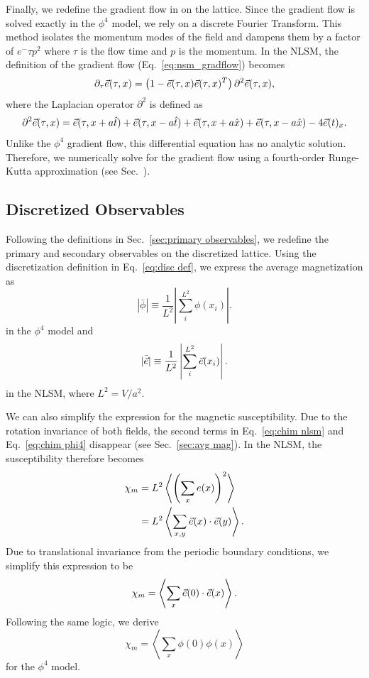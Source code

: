 Finally, we redefine the gradient flow in on the lattice. Since the gradient flow is solved exactly in the $\phi^4$ model, we rely on a discrete Fourier Transform. This method isolates the momentum modes of the field and dampens them by a factor of $e^-{\tau p^2}$ where $\tau$ is the flow time and $p$ is the momentum. In the NLSM, the definition of the gradient flow (Eq.~\ref{eq:nsm_gradflow}) becomes 
\begin{equation}
    \label{eq:nsm_gradflow_disc}
    \partial_\tau \vec e (\tau, x) = \left( 1 - \vec e(\tau,x) \vec e(\tau,x)^T\right) \partial^2 \vec e(\tau,x),
\end{equation}
 where the Laplacian operator $\partial^2$ is defined as
\begin{equation*}
    \partial^2 \vec e(\tau,x) = \vec e(\tau, x+a \hat{t}) + \vec e(\tau,x-a\hat t) + \vec e(\tau, x+a \hat{x}) + \vec e(\tau,x-a\hat x) - 4 \vec e(t)_x.
\end{equation*}
Unlike the $\phi^4$ gradient flow, this differential equation has no analytic solution. Therefore, we numerically solve for the gradient flow using a fourth-order Runge-Kutta approximation (see Sec.~\label{sec:runga-kutta}).

\subsection{Discretized Observables}
Following the definitions in Sec.~\ref{sec:primary observables}, we redefine the primary and secondary observables on the discretized lattice. Using the discretization definition in Eq.~\ref{eq:disc def}, we express the average magnetization as 
\begin{equation}
|\bar\phi| \equiv \frac{1}{L^2}\left| \sum_i^{L^2} \phi(x_i)\right|.
\end{equation}
in the $\phi^4$ model and 
\begin{equation}
    |\bar{\vec e}| \equiv \frac{1}{L^2}\left|\sum_i^{L^2} \vec e(x_i)\right|.
\end{equation}
in the NLSM, where $L^2 = V/a^2$.

We can also simplify the expression for the magnetic susceptibility. Due to the rotation invariance of both fields, the second terms in Eq.~\ref{eq:chim nlsm} and Eq.~\ref{eq:chim phi4} disappear (see Sec.~\ref{sec:avg mag}). In the NLSM, the susceptibility therefore becomes
\begin{align}
    \chi_m &= L^2 \left\langle \left( \sum_x e(x) \right)^2\right\rangle  \\
           &= L^2 \left\langle \sum_{x,y}\vec e(x)\cdot \vec e(y) \right\rangle. 
\end{align}
Due to translational invariance from the periodic boundary conditions, we simplify this expression to be
\begin{equation}
    \chi_m = \left\langle \sum_x \vec e(0)\cdot\vec e(x) \right\rangle.
\end{equation}
Following the same logic, we derive 
\begin{equation}
    \chi_m = \left\langle \sum_x \phi(0)\phi(x) \right\rangle
\end{equation}
for the $\phi^4$ model. 

